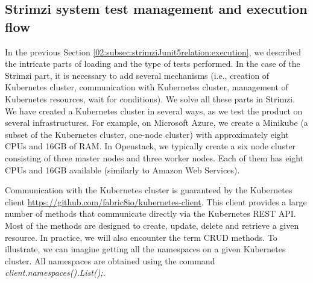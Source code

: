 \subsection{Strimzi system test management and execution flow}
\label{02:subsec:strimzisystemtestsexecution}

In the previous Section \ref{02:subsec:strimziJunit5relation:execution}, we described the intricate parts of loading and the type of tests performed. In the case of the Strimzi part, it is necessary to add several mechanisms (i.e., creation of Kubernetes cluster, communication with Kubernetes cluster, management of Kubernetes resources, wait for conditions). We solve all these parts in Strimzi. We have created a Kubernetes cluster in several ways, as we test the product on several infrastructures. For example, on Microsoft Azure, we create a Minikube (a subset of the Kubernetes cluster, one-node cluster) with approximately eight CPUs and 16GB of RAM. In Openstack, we typically create a six node cluster consisting of three master nodes and three worker nodes. Each of them has eight CPUs and 16GB available (similarly to Amazon Web Services).

Communication with the Kubernetes cluster is guaranteed by the Kubernetes client \url {https://github.com/fabric8io/kubernetes-client}. This client provides a large number of methods that communicate directly via the Kubernetes REST API. Most of the methods are designed to create, update, delete and retrieve a given resource. In practice, we will also encounter the term CRUD methods. To illustrate, we can imagine getting all the namespaces on a given Kubernetes cluster. All namespaces are obtained using the command \emph{client.namespaces().List();}.

